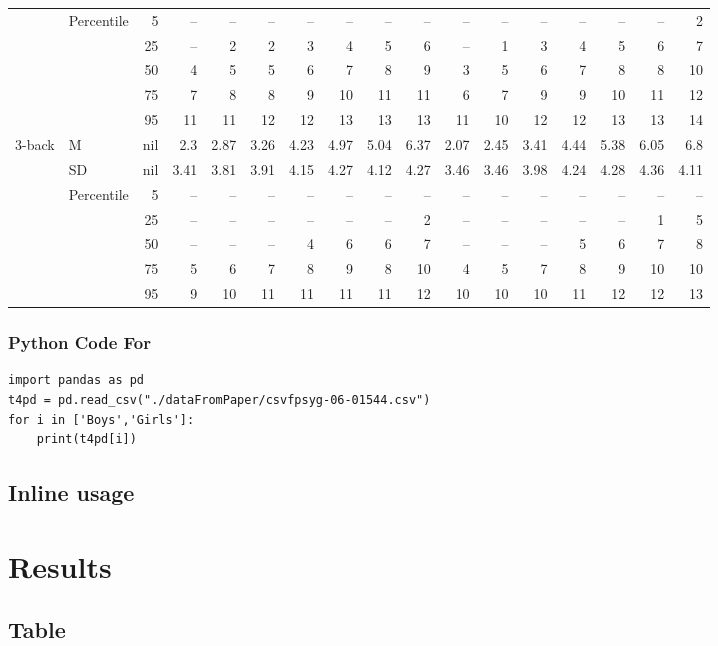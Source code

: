 \documentclass{article}
\begin{document}
\begin{center}
\begin{tabular}{llrrrrrrrrrrrrrrr}
 & Percentile & 5 & – & – & – & – & – & – & – & – & – & – & – & – & – & 2\\
 &  & 25 & – & 2 & 2 & 3 & 4 & 5 & 6 & – & 1 & 3 & 4 & 5 & 6 & 7\\
 &  & 50 & 4 & 5 & 5 & 6 & 7 & 8 & 9 & 3 & 5 & 6 & 7 & 8 & 8 & 10\\
 &  & 75 & 7 & 8 & 8 & 9 & 10 & 11 & 11 & 6 & 7 & 9 & 9 & 10 & 11 & 12\\
 &  & 95 & 11 & 11 & 12 & 12 & 13 & 13 & 13 & 11 & 10 & 12 & 12 & 13 & 13 & 14\\
3-back & M & nil & 2.3 & 2.87 & 3.26 & 4.23 & 4.97 & 5.04 & 6.37 & 2.07 & 2.45 & 3.41 & 4.44 & 5.38 & 6.05 & 6.8\\
 & SD & nil & 3.41 & 3.81 & 3.91 & 4.15 & 4.27 & 4.12 & 4.27 & 3.46 & 3.46 & 3.98 & 4.24 & 4.28 & 4.36 & 4.11\\
 & Percentile & 5 & – & – & – & – & – & – & – & – & – & – & – & – & – & –\\
 &  & 25 & – & – & – & – & – & – & 2 & – & – & – & – & – & 1 & 5\\
 &  & 50 & – & – & – & 4 & 6 & 6 & 7 & – & – & – & 5 & 6 & 7 & 8\\
 &  & 75 & 5 & 6 & 7 & 8 & 9 & 8 & 10 & 4 & 5 & 7 & 8 & 9 & 10 & 10\\
 &  & 95 & 9 & 10 & 11 & 11 & 11 & 11 & 12 & 10 & 10 & 10 & 11 & 12 & 12 & 13\\
\end{tabular}
\end{center}


\subsubsection{Python Code For}
\label{sec:orgd304c5c}
\begin{verbatim}
import pandas as pd
t4pd = pd.read_csv("./dataFromPaper/csvfpsyg-06-01544.csv")
for i in ['Boys','Girls']:
    print(t4pd[i])
\end{verbatim}

\subsection{Inline usage}
\label{sec:org34c5585}

\section{Results}
\label{sec:org39114a2}
\subsection{Table}
\label{sec:org56c4427}
\end{document}
